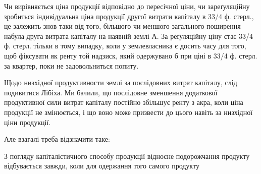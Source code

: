 Чи вирівняється ціна продукції відповідно до пересічної ціни, чи зареґуляційну
зробиться індивідуальна ціна продукції другої витрати капіталу в 33/4 ф. стерл.,
це залежить знов таки від того, більшого чи меншого загального поширення набула
друга витрата капіталу на наявній землі А. За реґуляційну ціну стає 33/4
ф. стерл. тільки в тому випадку, коли у землевласника є досить часу для того,
щоб фіксувати як ренту той надзиск, який одержувано б при ціні в 33/4 ф.
стерл. за квартер, поки не задовольниться попиту.

Щодо низхідної продуктивности землі за послідовних витрат капіталу,
слід подивитися Лібіха. Ми бачили, що послідовне зменшення додаткової продуктивної
сили витрат капіталу постійно збільшує ренту з акра, коли ціна
продукції не змінюється, і що воно може призвести до цього навіть за низхідної
ціни продукції.

Але взагалі треба відзначити таке:

З    погляду капіталістичного способу продукції відносне подорожчання
продукту відбувається завжди, коли для одержання того самого продукту
\parbreak{}  %
